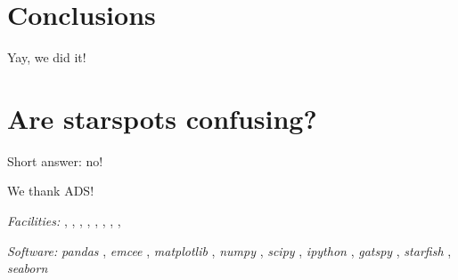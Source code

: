 \documentclass[twocolumn]{emulateapj}%
\newcommand{\project}[1]{\textsl{#1}}
\begin{document}
\section{Conclusions}

Yay, we did it!

\clearpage
\pagebreak


\appendix

\section{Are starspots confusing?}
\label{methods-details}

Short answer: no!

\acknowledgements

We thank ADS!


{\it Facilities:} , , , , , , , , 

{\it Software: }
 \project{pandas} \citep{mckinney10},
 \project{emcee} \citep{foreman13},
 \project{matplotlib} \citep{hunter07},
 \project{numpy} \citep{vanderwalt11},
 \project{scipy} \citep{jones01},
 \project{ipython} \citep{perez07},
 \project{gatspy} \citep{JakeVanderplas2015},
 \project{starfish} \citep{czekala15},
 \project{seaborn} \citep{waskom14}

\clearpage



\end{document}

